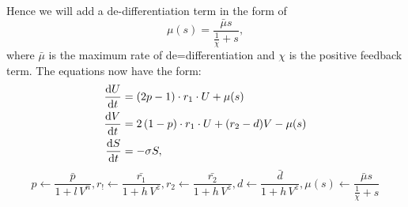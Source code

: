 \documentclass[12pt]{article}
\begin{document}
Hence we will add a de-differentiation term in the form of \[\mu(s) = \frac{\bar{\mu} s}{\frac{1}{\chi} + s},\] where $\bar{\mu}$ is the maximum rate of de=differentiation and $\chi$ is the positive feedback term. The equations now have the form:
\begin{align*}
\dv{U}{t}&=\left(2p-1\right)\cdot r_1\cdot U + \mu(s)\\
\dv{V}{t}&=2\left(1-p\right)\cdot r_1\cdot U +(r_2-d)V - \mu(s)\\
\dv{S}{t}&=-\sigma S,
\end{align*}
\[p\leftarrow\frac{\bar{p}}{1+l\,V^n},r_!\leftarrow\frac{\bar{r_1}}{1+h\,V^z},r_2\leftarrow\frac{\bar{r_2}}{1+h\,V^z},d\leftarrow\frac{\bar{d}}{1+h\,V^z},\mu(s) \leftarrow \frac{\bar{\mu} s}{\frac{1}{\chi} + s}\]
\begin{comment}
\section*{Why we can use Kim's parameters (needs to be deleted or cleaned up a lot)}
Starting with the Yu to Kim transition, we maintain Yu's parameters mainly out of convenience, but also the strictly decreasing aspect of both equations allows for the parameters to reasonably maintain their meaning across model descriptions. These parameters were chosen on the basis of doubling time of a growing tumor (cell type).

From Kim's model to my model, the death parameter and the constants of the survival fraction function (i.e. $\alpha$ and $\beta$) were modified. In the case of the former, a negative feedback term from differentiated cell was added; in the latter, negative feedback from survivin was added. 

Most parameters used will retain the value which has carried over from Yu's model. The ones which might require adjustment are the $\bar{\alpha}$ and $\bar{\beta}$ values. 
\end{comment}
\end{document}
